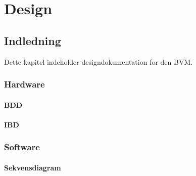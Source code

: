 
\chapter{Design}

\section{Indledning}

Dette kapitel indeholder designdokumentation for den BVM. 

\subsection{Hardware}

\subsubsection{BDD}
\subsubsection{IBD}




\subsection{Software}

\subsubsection{Sekvensdiagram}

